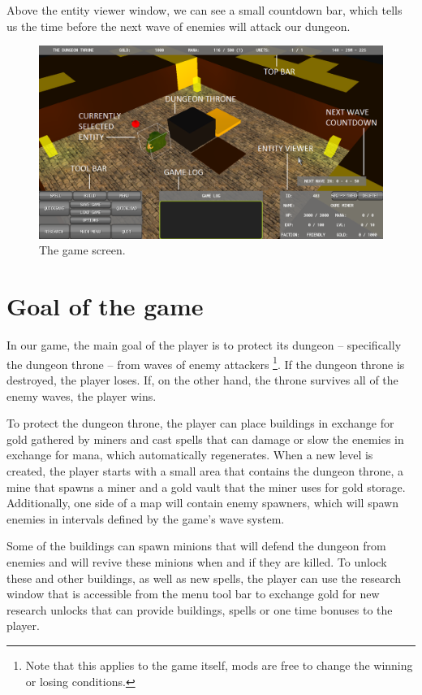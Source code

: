Above the entity viewer window, we can see a small countdown bar, which tells us the time before the next wave of enemies will attack our
dungeon.

\begin{figure}[H]
    \centering
    \includegraphics[width=\textwidth]{../img/gui-full-text.png}
    \caption{The game screen.}
    \label{gui-full}
\end{figure}

\section{Goal of the game}

In our game, the main goal of the player is to protect its dungeon -- specifically the dungeon throne -- from waves of enemy attackers
\footnote{Note that this applies to the game itself, mods are free to change the winning or losing conditions.}.
If the dungeon throne is destroyed, the player loses. If, on the other hand, the throne survives all of the enemy waves, the player wins.

To protect the dungeon throne, the player can place buildings in exchange for gold gathered by miners and cast spells that can damage or slow
the enemies in exchange for mana, which automatically regenerates. When a new level is created, the player starts with a small area that
contains the dungeon throne, a mine that spawns a miner and a gold vault that the miner uses for gold storage. Additionally, one side of a
map will contain enemy spawners, which will spawn enemies in intervals defined by the game's wave system.

Some of the buildings can spawn minions that will defend the dungeon from enemies and will revive these minions when and if they are killed.
To unlock these and other buildings, as well as new spells, the player can use the research window that is accessible from the menu tool
bar to exchange gold for new research unlocks that can provide buildings, spells or one time bonuses to the player.

